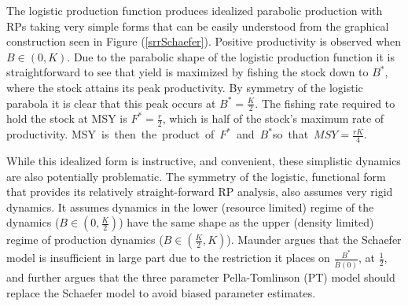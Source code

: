 %
The logistic production function produces idealized parabolic production with
RPs taking very simple forms that can be easily understood from the
graphical construction seen in Figure (\ref{srrSchaefer}). Positive
productivity is observed when \mbox{$B\in(0, K)$.} Due to the parabolic shape of the
logistic production function it is straightforward to see that yield is maximized
by fishing the stock down to $B^*$, where the stock attains its peak productivity.
By symmetry of the logistic parabola it is clear that this peak occurs at 
$B^*=\frac{K}{2}$. The fishing rate required to hold the stock at MSY is 
$F^*=\frac{r}{2}$, which is half of the stock's maximum rate of productivity. 
\mbox{MSY is then the product of $F^*$ and $B^*$so that $MSY=\frac{rK}{4}$.}

%
While this idealized form is instructive, and convenient, these simplistic 
dynamics are also potentially problematic. The symmetry of the logistic, 
functional form that provides its relatively straight-forward RP analysis, also 
assumes very rigid dynamics. It assumes dynamics in the lower 
(resource limited) regime of the dynamics ($B\in(0, \frac{K}{2})$) 
have the same shape as the upper (density limited) regime of production 
dynamics ($B\in(\frac{K}{2}, K)$). 
Maunder \cite{maunder_is_2003} argues that the Schaefer model is
insufficient in large part due to the restriction it places on $\frac{B^*}{\bar B(0)}$,
at $\frac{1}{2}$, and further argues that the three parameter Pella-Tomlinson
(PT) model \cite{pella_generalized_1969} should replace the Schaefer model to 
avoid biased parameter estimates.


